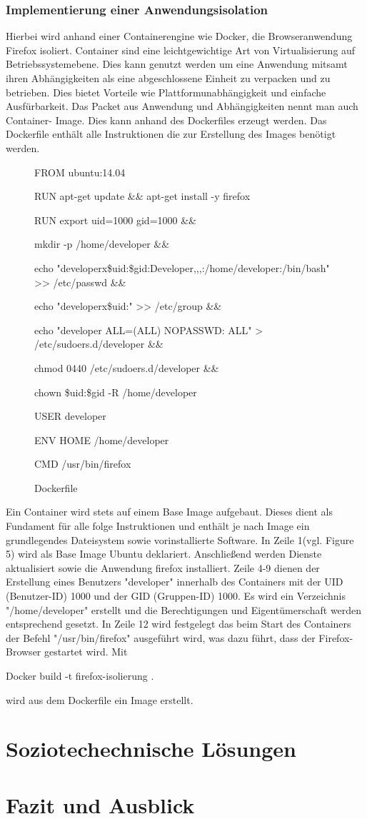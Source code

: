 \documentclass[journal=tosc,final]{iacrtrans}
\begin{document}
\subsubsection{Implementierung einer Anwendungsisolation}
Hierbei wird anhand einer Containerengine wie Docker, die Browseranwendung Firefox isoliert.
Container sind eine leichtgewichtige Art von Virtualisierung auf Betriebssystemebene. Dies kann genutzt werden um eine Anwendung mitsamt ihren Abhängigkeiten als eine abgeschlossene Einheit zu verpacken und zu betrieben.
Dies bietet Vorteile wie Plattformunabhängigkeit und einfache Ausfürbarkeit.
Das Packet aus Anwendung und Abhängigkeiten nennt man auch Container-
Image. Dies kann anhand des Dockerfiles erzeugt werden. Das Dockerfile
enthält alle Instruktionen die zur Erstellung des Images benötigt werden.
\begin{figure}[h]
\caption{Dockerfile }
\begin{shaded}
\begin{internallinenumbers}
FROM ubuntu:14.04

RUN apt-get update \&\& apt-get install -y firefox

RUN export uid=1000 gid=1000 \&\& \

mkdir -p /home/developer \&\& \

echo "developerx\${uid}:\${gid}:Developer,,,:/home/developer:/bin/bash" >> /etc/passwd \&\& \

echo "developerx\${uid}:" >> /etc/group \&\& \

echo "developer ALL=(ALL) NOPASSWD: ALL" > /etc/sudoers.d/developer \&\& \

chmod 0440 /etc/sudoers.d/developer \&\& \

chown \${uid}:\${gid} -R /home/developer

USER developer

ENV HOME /home/developer

CMD /usr/bin/firefox

 \end{internallinenumbers}
\end{shaded}
\end{figure}

Ein Container wird stets auf einem Base Image aufgebaut. Dieses dient als
Fundament für alle folge Instruktionen und enthält je nach Image ein grundlegendes Dateisystem sowie vorinstallierte Software.
In Zeile 1(vgl. Figure 5) wird als Base Image Ubuntu deklariert. Anschließend werden Dienste aktualisiert sowie die Anwendung firefox installiert. Zeile 4-9 dienen der Erstellung eines Benutzers "developer" innerhalb des Containers mit der UID (Benutzer-ID) 1000 und der GID (Gruppen-ID) 1000. Es wird ein Verzeichnis "/home/developer" erstellt und die Berechtigungen und Eigentümerschaft werden entsprechend gesetzt. In Zeile 12 wird festgelegt das beim Start des Containers der Befehl "/usr/bin/firefox" ausgeführt wird, was dazu führt, dass der Firefox-Browser gestartet wird. Mit \colorbox{mshadecolor}{\parbox{0.38\textwidth}{Docker build -t firefox-isolierung .}} wird aus dem Dockerfile ein Image erstellt.
\section{Soziotechechnische Lösungen} 
\section{Fazit und Ausblick}


\end{document}
